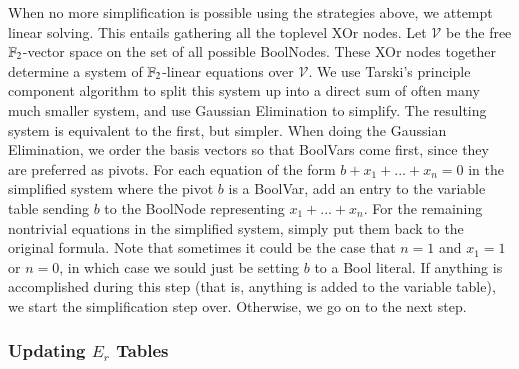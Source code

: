 When no more simplification is possible using the strategies above, we attempt linear solving.
This entails gathering all the toplevel XOr nodes.  Let $\mathcal{V}$ be the free $\mathbb{F}_2$-vector space on the set of all possible BoolNodes.
These XOr nodes together determine a system of $\mathbb{F}_2$-linear equations over $\mathcal{V}$.
We use Tarski's principle component algorithm to split this system up into a direct sum of often many much smaller system, and use Gaussian Elimination to simplify.  
The resulting system is equivalent to the first, but simpler.
When doing the Gaussian Elimination, we order the basis vectors so that BoolVars come first, since they are preferred as pivots.  
For each equation of the form $b+x_1+...+x_n=0$ in the simplified system where the pivot $b$ is a BoolVar, add an entry to the variable table sending $b$ to the BoolNode representing $x_1+...+x_n$.
For the remaining nontrivial equations in the simplified system, simply put them back to the original formula.  
Note that sometimes it could be the case that $n=1$ and $x_1=1$ or $n=0$, in which case we sould just be setting $b$ to a Bool literal.  
If anything is accomplished during this step (that is, anything is added to the variable table), we start the simplification step over.
Otherwise, we go on to the next step.  

\subsubsection{Updating $E_r$ Tables}


